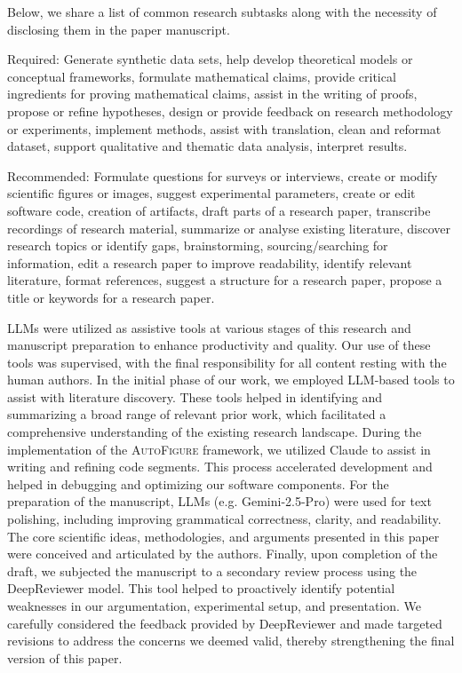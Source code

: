 \documentclass{article} %
\begin{document}
Below, we share a list of common research subtasks along with the necessity of disclosing them in the paper manuscript.

Required: Generate synthetic data sets, help develop theoretical models or conceptual frameworks, formulate mathematical claims, provide critical ingredients for proving mathematical claims, assist in the writing of proofs, propose or refine hypotheses, design or provide feedback on research  methodology or experiments, implement methods, assist with translation, clean and reformat dataset, support qualitative and thematic data analysis, interpret results. 

Recommended: Formulate questions for surveys or interviews, create or modify scientific figures or images, suggest experimental parameters, create or edit software code,  creation of artifacts, draft parts of a research paper, transcribe recordings of research material, summarize or analyse existing literature, discover research topics or identify gaps, brainstorming, sourcing/searching for information, edit a research paper to improve readability, identify relevant literature, format references, suggest a structure for a research paper, propose a title or keywords for a research paper.

LLMs were utilized as assistive tools at various stages of this research and manuscript preparation to enhance productivity and quality. Our use of these tools was supervised, with the final responsibility for all content resting with the human authors. In the initial phase of our work, we employed LLM-based tools to assist with literature discovery. These tools helped in identifying and summarizing a broad range of relevant prior work, which facilitated a comprehensive understanding of the existing research landscape. During the implementation of the \textsc{AutoFigure} framework, we utilized Claude to assist in writing and refining code segments. This process accelerated development and helped in debugging and optimizing our software components. For the preparation of the manuscript, LLMs (e.g. Gemini-2.5-Pro) were used for text polishing, including improving grammatical correctness, clarity, and readability. The core scientific ideas, methodologies, and arguments presented in this paper were conceived and articulated by the authors. Finally, upon completion of the draft, we subjected the manuscript to a secondary review process using the DeepReviewer \citep{zhu2025deepreview} model. This tool helped to proactively identify potential weaknesses in our argumentation, experimental setup, and presentation. We carefully considered the feedback provided by DeepReviewer and made targeted revisions to address the concerns we deemed valid, thereby strengthening the final version of this paper.
\end{document}
